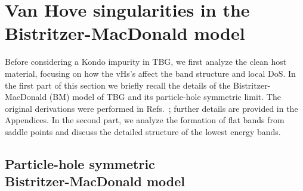

\section{Van Hove singularities in the Bistritzer-MacDonald model} \label{sec:BM-model}

Before considering a Kondo impurity in TBG, we first analyze the clean host material, focusing on how the vHs's affect the band structure and local DoS. In the first part of this section we briefly recall the details of the Bistritzer-MacDonald (BM) model of TBG and its particle-hole symmetric limit. The original derivations were performed in Refs.~\cite{Bistritzer2011,Suarez2011,Bernevig2019PRL-TBG}; further details are provided in the Appendices. In the second part, we analyze the formation of flat bands from saddle points and discuss the detailed structure of the lowest energy bands.


\subsection{Particle-hole symmetric\\Bistritzer-MacDonald model}

